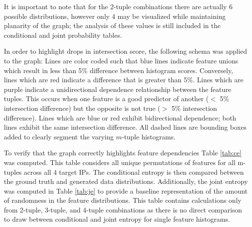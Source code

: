 It is important to note that for the 2-tuple combinations there are actually 6 possible distributions, however only 4 may be visualized while maintaining planarity of the graph; the analysis of these values is still included in the conditional and joint probability tables.

In order to highlight drops in intersection score, the following schema was applied to the graph: Lines are color coded such that blue lines indicate feature unions which result in less than 5\% difference between histogram scores. Conversely, lines which are red indicate a difference that is greater than 5\%. Lines which are purple indicate a unidirectional dependence relationship between the feature tuples. This occurs when one feature is a good predictor of another ($<$ 5\% intersection difference) but the opposite is not true ($>$ 5\% intersection difference). Lines which are blue or red exhibit bidirectional dependence; both lines exhibit the same intersection difference. All dashed lines are bounding boxes added to clearly segment the varying $m$-tuple histograms.

To verify that the graph correctly highlights feature dependencies Table \ref{tab:ce} was computed. This table considers all unique permutations of features for all m-tuples across all 4 target IPs. The conditional entropy is then compared between the ground truth and generated data distributions. Additionally, the joint entropy was computed in Table \ref{tab:je} to provide a baseline representation of the amount of randomness in the feature distributions. This table contains calculations only from 2-tuple, 3-tuple, and 4-tuple combinations as there is no direct comparison to draw between conditional and joint entropy for single feature histograms.


